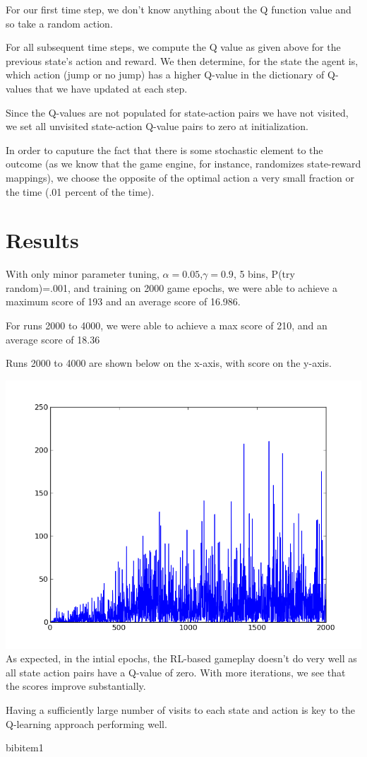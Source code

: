 \documentclass[11pt, oneside]{article}   	%
\begin{document}
For our first time step, we don't know anything about the Q function value and so take a random action.

For all subsequent time steps, we compute the Q value as given above for the previous state's action and reward. We then determine, for the state the agent is, which action (jump or no jump) has a higher Q-value in the dictionary of Q-values that we have updated at each step.

Since the Q-values are not populated for state-action pairs we have not visited, we set all unvisited state-action Q-value pairs to zero at initialization.

In order to caputure the fact that there is some stochastic element to the outcome (as we know that the game engine, for instance, randomizes state-reward mappings), we choose the opposite of the optimal action a very small fraction or the time (.01 percent of the time).

\section*{Results}
With only minor parameter tuning, $\alpha = 0.05$,$\gamma = 0.9$, 5 bins, P(try random)=.001, and training on 2000 game epochs, we were able to achieve a maximum score of 193 and an average score of 16.986.

For runs 2000 to 4000, we were able to achieve a max score of 210, and an average score of 18.36

Runs 2000 to 4000 are shown below on the x-axis, with score on the y-axis.

\includegraphics[scale=.5]{graph2}
\newline
As expected, in the intial epochs, the RL-based gameplay doesn't do very well as all state action pairs have a Q-value of zero. With more iterations, we see that the scores improve substantially.

Having a sufficiently large number of visits to each state and action is key to the Q-learning approach performing well.

\begin{thebibliography}{1}

 bibitem1 
 
  \end{thebibliography}
\end{document}

